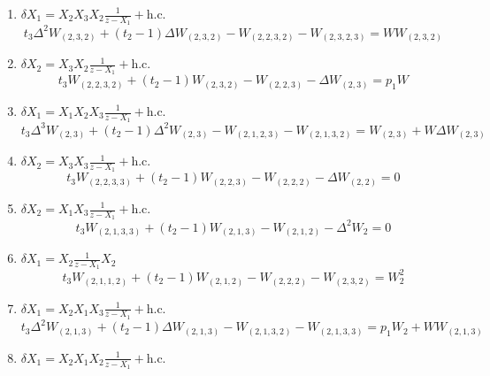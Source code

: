 \begin{enumerate}
    \item $\delta X_1 = X_2 X_3 X_2 \frac{1}{z-X_1}+\text{h.c.}$
          \begin{equation}
              \label{7}
              t_3 \Delta^2 W_{(2,3,2)} + (t_2-1)\Delta W_{(2,3,2)} - W_{(2,2,3,2)} - W_{(2,3,2,3)} = W W_{(2,3,2)}
          \end{equation}
    \item $\delta X_2 = X_3 X_2 \frac{1}{z-X_1} + \text{h.c.}$
          \begin{equation}
              \label{8}
              t_3 W_{(2,2,3,2)} + (t_2-1)W_{(2,3,2)} - W_{(2,2,3)} - \Delta W_{(2,3)} = p_{1}W
          \end{equation}
    \item $\delta X_1 = X_1 X_2 X_3 \frac{1}{z-X_1} + \text{h.c.}$
          \begin{equation}
              \label{9}
              t_3 \Delta^3 W_{(2,3)} + (t_2 - 1)\Delta^2 W_{(2,3)} - W_{(2,1,2,3)} - W_{(2,1,3,2)} = W_{(2,3)} + W\Delta W_{(2,3)}
          \end{equation}
    \item $\delta X_2 = X_3 X_3 \frac{1}{z-X_1} + \text{h.c.}$
          \begin{equation}
              \label{10}
              t_3 W_{(2,2,3,3)} + (t_2-1) W_{(2,2,3)} - W_{(2,2,2)} - \Delta W_{(2,2)} = 0
          \end{equation}
    \item $\delta X_2 = X_1 X_3 \frac{1}{z-X_1} + \text{h.c.}$
          \begin{equation}
              \label{11}
              t_3 W_{(2,1,3,3)} + (t_2 -1)W_{(2,1,3)} - W_{(2,1,2)} - \Delta^2 W_{2} = 0
          \end{equation}
    \item $\delta X_1 = X_2 \frac{1}{z-X_1} X_2$
          \begin{equation}
              \label{12}
              t_3 W_{(2,1,1,2)} + (t_2-1)W_{(2,1,2)} - W_{(2,2,2)} - W_{(2,3,2)} = W_2^2
          \end{equation}
    \item $\delta X_1 = X_2 X_1 X_3 \frac{1}{z-X_1} + \text{h.c.}$
          \begin{equation}
              \label{13}
              t_3 \Delta^2 W_{(2,1,3)} + (t_2-1)\Delta W_{(2,1,3)} - W_{(2,1,3,2)} - W_{(2,1,3,3)} = p_1 W_2 + W W_{(2,1,3)}
          \end{equation}
    \item $\delta X_1 = X_2 X_1 X_2 \frac{1}{z-X_1} + \text{h.c.}$

\end{enumerate}
